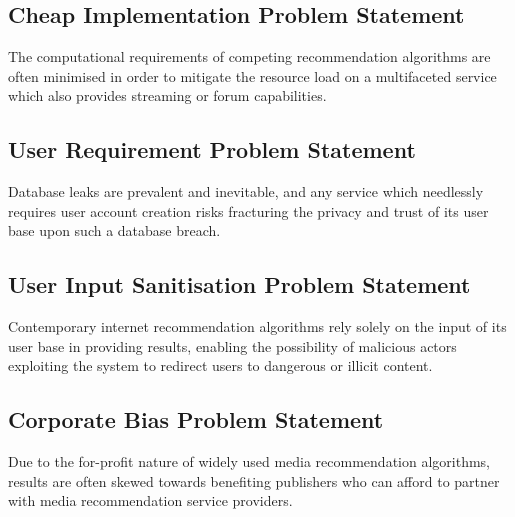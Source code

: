 \documentclass{article}
\begin{document}
\subsection{Cheap Implementation Problem Statement}
The computational requirements of competing recommendation algorithms are
often minimised in order to mitigate the resource load on a multifaceted
service which also provides streaming or forum capabilities.
\subsection{User Requirement Problem Statement}
Database leaks are prevalent and inevitable, and any service which needlessly
requires user account creation risks fracturing the privacy and trust of its
user base upon such a database breach.
\subsection{User Input Sanitisation Problem Statement}
Contemporary internet recommendation algorithms rely solely on the input
of its user base in providing results, enabling the possibility of malicious
actors exploiting the system to redirect users to dangerous or illicit content.
\subsection{Corporate Bias Problem Statement}
Due to the for-profit nature of widely used media recommendation algorithms,
results are often skewed towards benefiting publishers who can afford to
partner with media recommendation service providers.
\end{document}
